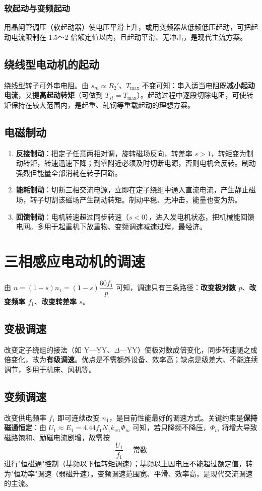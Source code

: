 \subsubsection{软起动与变频起动}
用晶闸管调压（软起动器）使电压平滑上升，或用变频器从低频低压起动，可把起动电流限制在 1.5～2 倍额定值以内，且起动平滑、无冲击，是现代主流方案。

\subsection{绕线型电动机的起动}
绕线型转子可外串电阻。由 $s_m\propto R_2'$、$T_{\max}$ 不变可知：串入适当电阻既\textbf{减小起动电流}，又\textbf{提高起动转矩}（可做到 $T_{st}=T_{\max}$）。起动过程中逐段切除电阻，可使转矩保持在较大范围内，是起重、轧钢等重载起动的理想方案。

\subsection{电磁制动}
\begin{enumerate}
  \item \textbf{反接制动}：把定子任意两相对调，旋转磁场反向，转差率 $s>1$，转矩变为制动转矩，转速迅速下降；到零附近必须及时切断电源，否则电机会反转。制动强烈但能量全部消耗在转子回路。
  \item \textbf{能耗制动}：切断三相交流电源，立即在定子绕组中通入直流电流，产生静止磁场，转子切割该磁场产生制动转矩。制动平稳、无冲击，能量也变为热。
  \item \textbf{回馈制动}：电机转速超过同步转速（$s<0$），进入发电机状态，把机械能回馈电网。多用于起重机下放重物、变频调速减速过程，最经济。
\end{enumerate}

\section{三相感应电动机的调速}

由 $n=(1-s)n_1=(1-s)\dfrac{60f_1}{p}$ 可知，调速只有三条路径：\textbf{改变极对数 $p$}、\textbf{改变频率 $f_1$}、\textbf{改变转差率 $s$}。

\subsection{变极调速}
改变定子绕组的接法（如 Y—YY、$\Delta$—YY）使极对数成倍变化，同步转速随之成倍变化，故为\textbf{有级调速}。优点是不需额外设备、效率高；缺点是级差大、不能连续调节，多用于机床、风机等。

\subsection{变频调速}
改变供电频率 $f_1$ 即可连续改变 $n_1$，是目前性能最好的调速方式。关键约束是\textbf{保持磁通恒定}：由 $U_1\approx E_1=4.44f_1N_1k_{w1}\Phi_m$ 可知，若只降频不降压，$\Phi_m$ 将增大导致磁路饱和、励磁电流剧增，故需按
\begin{equation}
\frac{U_1}{f_1}=\text{常数}
\end{equation}
进行"恒磁通"控制（基频以下恒转矩调速）；基频以上因电压不能超过额定值，转为"恒功率"调速（弱磁升速）。变频调速范围宽、平滑、效率高，是现代交流调速的主流。

